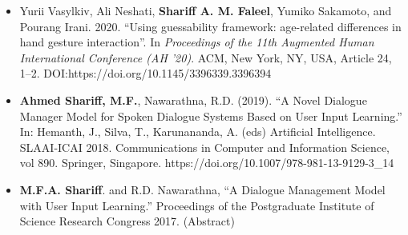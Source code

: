 \documentclass[a4paper,11pt]{article}
\begin{document}
\begin{itemize}
  \item[]Yurii Vasylkiv, Ali Neshati, \textbf{Shariff A. M. Faleel}, Yumiko Sakamoto, and Pourang Irani. 2020. ``Using guessability framework: age-related differences in hand gesture interaction''. In \textit{Proceedings of the 11th Augmented Human International Conference (AH '20)}. ACM, New York, NY, USA, Article 24, 1–2. DOI:https://doi.org/10.1145/3396339.3396394
  \item[]\textbf{Ahmed Shariff, M.F.}, Nawarathna, R.D. (2019). ``A Novel Dialogue Manager Model for Spoken Dialogue Systems Based on User Input Learning.'' In: Hemanth, J., Silva, T., Karunananda, A. (eds) Artificial Intelligence. SLAAI-ICAI 2018. Communications in Computer and Information Science, vol 890. Springer, Singapore. https://doi.org/10.1007/978-981-13-9129-3\_14
  \item[]\textbf{M.F.A. Shariff}. and R.D. Nawarathna, ``A Dialogue Management Model with User Input Learning.'' Proceedings of the Postgraduate Institute of Science Research Congress 2017. (Abstract)
\end{itemize}


\end{document}
